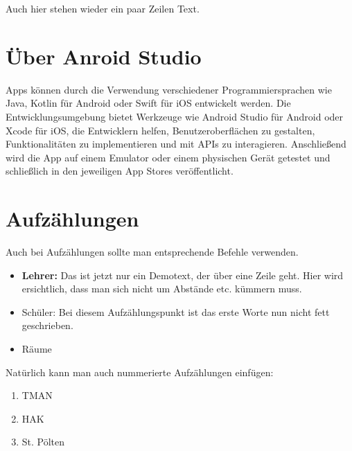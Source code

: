 Auch hier stehen wieder ein paar Zeilen Text.
	
	
\section{Über Anroid Studio}
Apps können durch die Verwendung verschiedener Programmiersprachen wie Java, Kotlin für Android oder Swift für iOS entwickelt werden. Die Entwicklungsumgebung bietet Werkzeuge wie Android Studio für Android oder Xcode für iOS, die Entwicklern helfen, Benutzeroberflächen zu gestalten, Funktionalitäten zu implementieren und mit APIs zu interagieren. Anschließend wird die App auf einem Emulator oder einem physischen Gerät getestet und schließlich in den jeweiligen App Stores veröffentlicht.

\section{Aufzählungen}
Auch bei Aufzählungen sollte man entsprechende Befehle verwenden.
\begin{itemize}
	\item \textbf{Lehrer:} Das ist jetzt nur ein Demotext, der über eine Zeile geht. Hier wird ersichtlich, dass man sich nicht um Abstände etc. kümmern muss.
	\item Schüler: Bei diesem Aufzählungspunkt ist das erste Worte nun nicht fett geschrieben.
	\item Räume
\end{itemize}

Natürlich kann man auch nummerierte Aufzählungen einfügen:
\begin{enumerate}
	\item TMAN
	\item HAK
	\item St. Pölten
\end{enumerate}